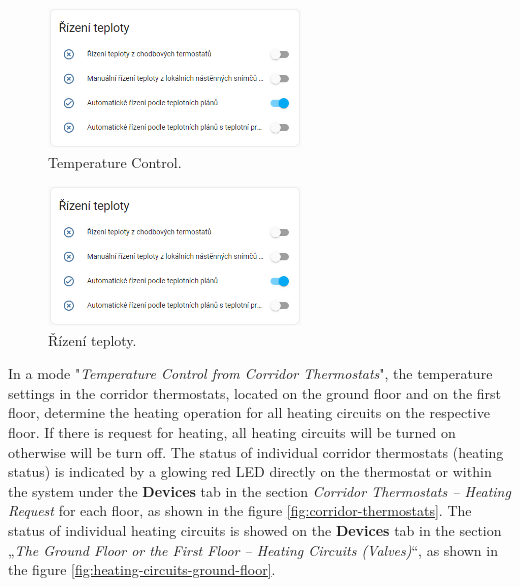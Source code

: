 \begin{English}
\begin{figure}[H]
    \centering
    \includegraphics[width=0.6\textwidth]{pictures/czech/software/temperature-control.png}
    \caption{Temperature Control.}
    \label{fig:temperature-control}
\end{figure}
\end{English}

\begin{Czech}
\begin{figure}[H]
    \centering
    \includegraphics[width=0.6\textwidth]{pictures/czech/software/temperature-control.png}
    \caption{Řízení teploty.}
    \label{fig:temperature-control}
\end{figure}
\end{Czech}


\begin{English}
\end{English}
\begin{Czech}
\end{Czech}


\begin{English}
In a mode "\textit{Temperature Control from Corridor Thermostats}", the temperature settings in the corridor thermostats, located on the ground floor and on the first floor, determine the heating operation for all heating circuits on the respective floor. If there is request for heating, all heating circuits will be turned on otherwise will be turn off. The status of individual corridor thermostats (heating status) is indicated by a glowing red LED directly on the thermostat or within the system under the \textbf{Devices} tab in the section \textit{Corridor Thermostats – Heating Request} for each floor, as shown in the figure \ref{fig:corridor-thermostats}. The status of individual heating circuits is showed on the \textbf{Devices} tab in the section „\textit{The Ground Floor or the First Floor – Heating Circuits (Valves)}“, as shown in the figure \ref{fig:heating-circuits-ground-floor}.
\end{English}

